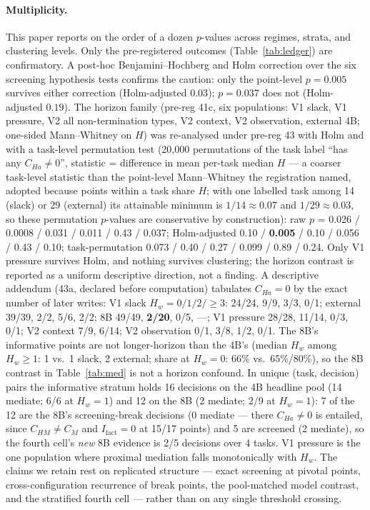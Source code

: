 \documentclass{article}
\theoremstyle{remark}
\begin{document}
\paragraph{Multiplicity.} This paper reports on the order of a dozen
$p$-values across regimes, strata, and clustering levels. Only the
pre-registered outcomes (Table~\ref{tab:ledger}) are confirmatory. A
post-hoc Benjamini--Hochberg and Holm correction over the six screening
hypothesis tests confirms the caution: only the point-level
$p = 0.005$ survives either correction (Holm-adjusted $0.03$); $p = 0.037$
does not (Holm-adjusted $0.19$). The horizon family (pre-reg 41c, six
populations: V1 slack, V1 pressure, V2 all non-termination types, V2
context, V2 observation, external 4B; one-sided Mann--Whitney on $H$) was
re-analysed under pre-reg 43 with Holm and with a task-level permutation
test (20{,}000 permutations of the task label ``has any $C_{Ha} \neq
0$'', statistic = difference in mean per-task median $H$ --- a coarser
task-level statistic than the point-level Mann--Whitney the registration
named, adopted because points within a task share $H$; with one labelled
task among 14 (slack) or 29 (external) its attainable minimum is $1/14
\approx 0.07$ and $1/29 \approx 0.03$, so these permutation $p$-values
are conservative by construction): raw $p$ =
0.026 / 0.0008 / 0.031 / 0.011 / 0.43 / 0.037; Holm-adjusted 0.10 /
\textbf{0.005} / 0.10 / 0.056 / 0.43 / 0.10; task-permutation 0.073 /
0.40 / 0.27 / 0.099 / 0.89 / 0.24. Only V1 pressure survives Holm, and
nothing survives clustering; the horizon contrast is reported as a
uniform descriptive direction, not a finding. A descriptive addendum
(43a, declared before computation) tabulates $C_{Ha} = 0$ by the exact
number of later writes: V1 slack $H_w = 0/1/2/{\geq}3$: 24/24, 9/9, 3/3,
0/1; external 39/39, 2/2, 5/6, 2/2; 8B 49/49, \textbf{2/20}, 0/5, ---;
V1 pressure 28/28, 11/14, 0/3, 0/1; V2 context 7/9, 6/14; V2 observation
0/1, 3/8, 1/2, 0/1. The 8B's informative points are not longer-horizon
than the 4B's (median $H_w$ among $H_w \geq 1$: 1 vs.\ 1 slack, 2
external; share at $H_w = 0$: 66\% vs.\ 65\%/80\%), so the 8B contrast
in Table~\ref{tab:med} is not a horizon confound. In unique (task,
decision) pairs the informative stratum holds 16 decisions on the 4B
headline pool (14 mediate; 6/6 at $H_w = 1$) and 12 on the 8B (2
mediate; 2/9 at $H_w = 1$): 7 of the 12 are the 8B's screening-break
decisions (0 mediate --- there $C_{Ha} \neq 0$ is entailed, since
$C_{HM} \neq C_M$ and $I_{\text{fact}} = 0$ at 15/17 points) and 5 are
screened (2 mediate), so the fourth cell's \emph{new} 8B evidence is
2/5 decisions over 4 tasks. V1 pressure is the one
population where proximal mediation falls monotonically with $H_w$. The claims we retain rest
on replicated structure --- exact screening at pivotal points,
cross-configuration recurrence of break points, the pool-matched model
contrast, and the stratified fourth cell --- rather than on any single
threshold crossing.
\end{document}
